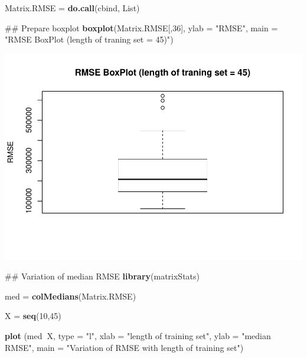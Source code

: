 \documentclass[a4paper, 12pt]{article}
\newenvironment{Shaded}{\begin{snugshade}}{\end{snugshade}}
\newcommand{\KeywordTok}[1]{\textcolor[rgb]{0.13,0.29,0.53}{\textbf{#1}}}
\newcommand{\DataTypeTok}[1]{\textcolor[rgb]{0.13,0.29,0.53}{#1}}
\newcommand{\DecValTok}[1]{\textcolor[rgb]{0.00,0.00,0.81}{#1}}
\newcommand{\StringTok}[1]{\textcolor[rgb]{0.31,0.60,0.02}{#1}}
\newcommand{\OperatorTok}[1]{\textcolor[rgb]{0.81,0.36,0.00}{\textbf{#1}}}
\newcommand{\NormalTok}[1]{#1}
\begin{document}
\begin{Shaded}
\begin{Highlighting}[]
\NormalTok{Matrix.RMSE =}\StringTok{ }\KeywordTok{do.call}\NormalTok{(cbind, List)}

\NormalTok{## Prepare boxplot}
\KeywordTok{boxplot}\NormalTok{(Matrix.RMSE[,}\DecValTok{36}\NormalTok{], }\DataTypeTok{ylab =} \StringTok{"RMSE"}\NormalTok{, }\DataTypeTok{main =} \StringTok{"RMSE BoxPlot (length of traning set = 45)"}\NormalTok{)}
\end{Highlighting}
\end{Shaded}

\includegraphics{Artigo_files/figure-latex/unnamed-chunk-5-1.pdf}

\begin{Shaded}
\begin{Highlighting}[]
\NormalTok{## Variation of median RMSE }
\KeywordTok{library}\NormalTok{(matrixStats)}

\NormalTok{med =}\StringTok{ }\KeywordTok{colMedians}\NormalTok{(Matrix.RMSE)}

\NormalTok{X =}\StringTok{ }\KeywordTok{seq}\NormalTok{(}\DecValTok{10}\NormalTok{,}\DecValTok{45}\NormalTok{)}

\KeywordTok{plot}\NormalTok{ (med}\OperatorTok{~}\NormalTok{X, }\DataTypeTok{type =} \StringTok{"l"}\NormalTok{, }\DataTypeTok{xlab =} \StringTok{"length of training set"}\NormalTok{, }\DataTypeTok{ylab =} \StringTok{"median RMSE"}\NormalTok{, }\DataTypeTok{main =} \StringTok{"Variation of RMSE with length of training set"}\NormalTok{)}
\end{Highlighting}
\end{Shaded}
\end{document}
